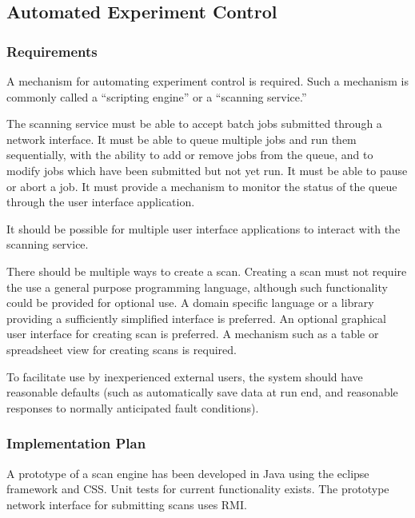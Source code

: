 \subsection{Automated Experiment Control}
\subsubsection{Requirements}

A mechanism for automating experiment control is required. Such a
mechanism is commonly called a ``scripting engine'' or a ``scanning
service.''

The scanning service must be able to accept batch jobs submitted through
a network interface. It must be able to queue multiple jobs and run them
sequentially, with the ability to add or remove jobs from the queue,
and to modify jobs which have been submitted but not yet run. It must
be able to pause or abort a job. It must provide a mechanism to monitor
the status of the queue through the user interface application.

It should be possible for multiple user interface applications to interact
with the scanning service.

There should be multiple ways to create a scan. Creating a scan must
not require the use a general purpose programming language, although
such functionality could be provided for optional use. A domain specific
language or a library providing a sufficiently simplified interface
is preferred.  An optional
graphical user interface for creating scan is preferred. A mechanism
such as a table or spreadsheet view for creating scans is required.

To facilitate use by inexperienced external users, the system should
have reasonable defaults (such as automatically save data at run end,
and reasonable responses to normally anticipated fault conditions).

\subsubsection{Implementation Plan}

A prototype of a scan engine has been developed in Java using the
eclipse framework and CSS. Unit tests for current functionality exists.
The prototype network interface for submitting scans uses RMI.

